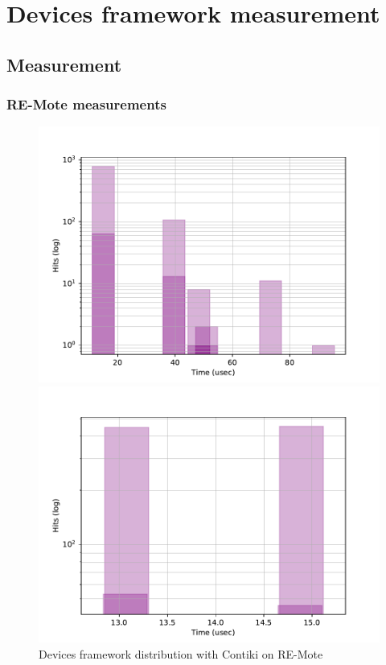 \section{Devices framework measurement}

\subsection{Measurement}

\subsubsection{RE-Mote measurements}



\begin{figure}[!ht]
  \begin{minipage}{.45\textwidth}
      \centering
      \includegraphics[scale=.4]{assets/devices-framework-contiki-remote.pdf}
      \caption{Devices framework distribution with Contiki on RE-Mote\label{fig:comparison-devices-framework-contiki-remote}}
  \end{minipage}\hfill
  \begin{minipage}{.45\textwidth}        
      \centering
      \includegraphics[scale=.4]{assets/devices-framework-riot-remote.pdf}

\end{minipage}
\end{figure}
